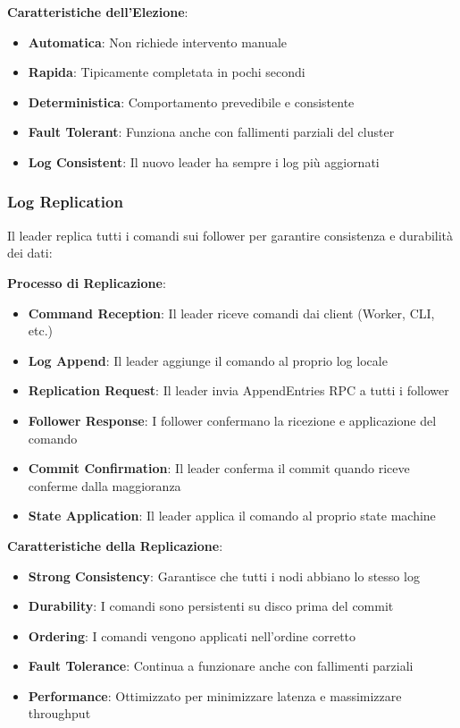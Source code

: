 \documentclass[12pt,a4paper]{article}
\begin{document}
\textbf{Caratteristiche dell'Elezione}:
\begin{itemize}
\item \textbf{Automatica}: Non richiede intervento manuale
\item \textbf{Rapida}: Tipicamente completata in pochi secondi
\item \textbf{Deterministica}: Comportamento prevedibile e consistente
\item \textbf{Fault Tolerant}: Funziona anche con fallimenti parziali del cluster
\item \textbf{Log Consistent}: Il nuovo leader ha sempre i log più aggiornati
\end{itemize}

\subsubsection{Log Replication}

Il leader replica tutti i comandi sui follower per garantire consistenza e durabilità dei dati:

\textbf{Processo di Replicazione}:
\begin{itemize}
\item \textbf{Command Reception}: Il leader riceve comandi dai client (Worker, CLI, etc.)
\item \textbf{Log Append}: Il leader aggiunge il comando al proprio log locale
\item \textbf{Replication Request}: Il leader invia AppendEntries RPC a tutti i follower
\item \textbf{Follower Response}: I follower confermano la ricezione e applicazione del comando
\item \textbf{Commit Confirmation}: Il leader conferma il commit quando riceve conferme dalla maggioranza
\item \textbf{State Application}: Il leader applica il comando al proprio state machine
\end{itemize}

\textbf{Caratteristiche della Replicazione}:
\begin{itemize}
\item \textbf{Strong Consistency}: Garantisce che tutti i nodi abbiano lo stesso log
\item \textbf{Durability}: I comandi sono persistenti su disco prima del commit
\item \textbf{Ordering}: I comandi vengono applicati nell'ordine corretto
\item \textbf{Fault Tolerance}: Continua a funzionare anche con fallimenti parziali
\item \textbf{Performance}: Ottimizzato per minimizzare latenza e massimizzare throughput
\end{itemize}
\end{document}
